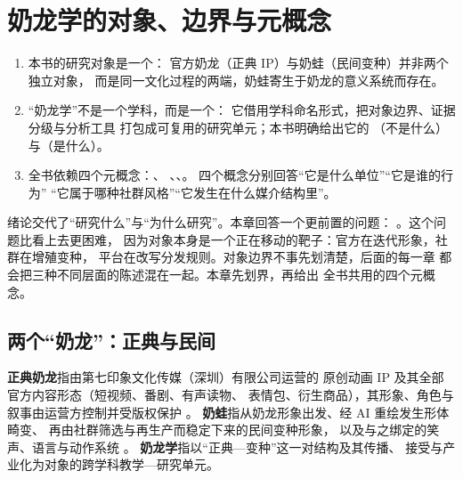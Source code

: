 \chapter{奶龙学的对象、边界与元概念}\label{ch:02}

\begin{nlkeypoints}
  \begin{enumerate}[label=(\arabic*),leftmargin=2.4em]
    \item 本书的研究对象是一个：
          官方奶龙（正典 IP）与奶蛙（民间变种）并非两个独立对象，
          而是同一文化过程的两端，奶蛙寄生于奶龙的意义系统而存在。
    \item “奶龙学”不是一个学科，而是一个：
          它借用学科命名形式，把对象边界、证据分级与分析工具
          打包成可复用的研究单元；本书明确给出它的
          （不是什么）与（是什么）。
    \item 全书依赖四个元概念：、
          、、。
          四个概念分别回答“它是什么单位”“它是谁的行为”
          “它属于哪种社群风格”“它发生在什么媒介结构里”。
  \end{enumerate}
\end{nlkeypoints}

绪论交代了“研究什么”与“为什么研究”。本章回答一个更前置的问题：
。这个问题比看上去更困难，
因为对象本身是一个正在移动的靶子：官方在迭代形象，社群在增殖变种，
平台在改写分发规则。对象边界不事先划清楚，后面的每一章
都会把三种不同层面的陈述混在一起。本章先划界，再给出
全书共用的四个元概念。

\section{两个“奶龙”：正典与民间}\label{sec:02:canon}

\begin{definition}\label{def:02:object}
  \textbf{正典奶龙}指由第七印象文化传媒（深圳）有限公司运营的
  原创动画 IP 及其全部官方内容形态（短视频、番剧、有声读物、
  表情包、衍生商品），其形象、角色与叙事由运营方控制并受版权保护
  \cite{jiang2026nailong}。
  \textbf{奶蛙}指从奶龙形象出发、经 AI 重绘发生形体畸变、
  再由社群筛选与再生产而稳定下来的民间变种形象，
  以及与之绑定的笑声、语言与动作系统
  \cite{lostmedia2026naiwa,shoutanji2026naiwa}。
  \textbf{奶龙学}指以“正典—变种”这一对结构及其传播、
  接受与产业化为对象的跨学科教学—研究单元。
\end{definition}

